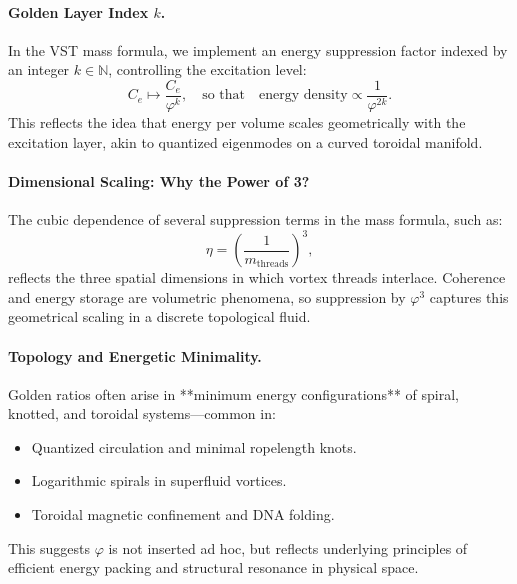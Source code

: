 \documentclass[11pt]{article}
\begin{document}
    \paragraph{Golden Layer Index \( k \).}
    In the VST mass formula, we implement an energy suppression factor indexed by an integer \( k \in \mathbb{N} \), controlling the excitation level:
    \begin{equation}
        C_e \longmapsto \frac{C_e}{\varphi^k}, \quad \text{so that} \quad \text{energy density} \propto \frac{1}{\varphi^{2k}}.
    \end{equation}
    This reflects the idea that energy per volume scales geometrically with the excitation layer, akin to quantized eigenmodes on a curved toroidal manifold.

    \paragraph{Dimensional Scaling: Why the Power of 3?}
    The cubic dependence of several suppression terms in the mass formula, such as:
    \begin{equation}
        \eta = \left( \frac{1}{m_{\text{threads}}} \right)^3,
    \end{equation}
    reflects the three spatial dimensions in which vortex threads interlace. Coherence and energy storage are volumetric phenomena, so suppression by \( \varphi^3 \) captures this geometrical scaling in a discrete topological fluid.

    \paragraph{Topology and Energetic Minimality.}
    Golden ratios often arise in **minimum energy configurations** of spiral, knotted, and toroidal systems—common in:
    \begin{itemize}
        \item Quantized circulation and minimal ropelength knots.
        \item Logarithmic spirals in superfluid vortices.
        \item Toroidal magnetic confinement and DNA folding.
    \end{itemize}
    This suggests \( \varphi \) is not inserted ad hoc, but reflects underlying principles of efficient energy packing and structural resonance in physical space.
\end{document}
